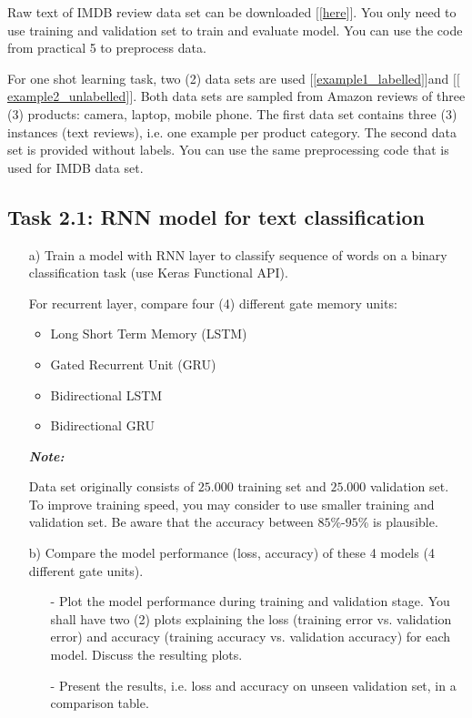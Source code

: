 \documentclass[a4paper,twoside,10pt]{article}
\begin{document}
Raw text of IMDB review data set can be downloaded \href{https://storage.googleapis.com/trl_data/imdb_dataset.zip}{$[[$here$]]$}. You only need to use training and validation set to train and evaluate model. You can use the code from practical 5 to preprocess data.

\justify
For one shot learning task, two (2) data sets are used \href{https://storage.googleapis.com/trl_data/example1_labelled.tsv}{$[[$example1\_labelled$]]$}and \href{https://storage.googleapis.com/trl_data/example2_unlabelled.tsv}{$[[$example2\_unlabelled$]]$}. Both data sets are sampled from Amazon reviews of three (3) products: camera, laptop, mobile phone. The first data set contains three (3) instances (text reviews), i.e. one example per product category. The second data set is provided without labels. You can use the same preprocessing code that is used for IMDB data set.


\subsection*{Task 2.1: RNN model for text classification}

\begin{itemize}
  \item[a)] Train a model with RNN layer to classify sequence of words on a binary classification task (use Keras Functional API).

\justify  
For recurrent layer, compare four (4) different gate memory units:
    \begin{itemize}
       \item Long Short Term Memory (LSTM)
       \item Gated Recurrent Unit (GRU)
       \item Bidirectional LSTM 
       \item Bidirectional GRU
   \end{itemize}


\justify
\textbf{\textit{Note:}}   

\justify
Data set originally consists of $25.000$ training set and $25.000$ validation set. To improve training speed, you may consider to use smaller training and validation set. Be aware that the accuracy between $85$\%-$95$\% is plausible.
   
  \item[b)] Compare the model performance (loss, accuracy) of these 4 models (4 different gate units). 
  
  \begin{itemize}
      \item[-] Plot the model performance during training and validation stage. You shall have two (2) plots explaining the loss (training error vs. validation error) and accuracy (training accuracy vs. validation accuracy) for each model. Discuss the resulting plots.
      \item[-] Present the results, i.e. loss and accuracy on unseen validation set, in a comparison table.
  \end{itemize}
  
 
\end{itemize}
\end{document}
